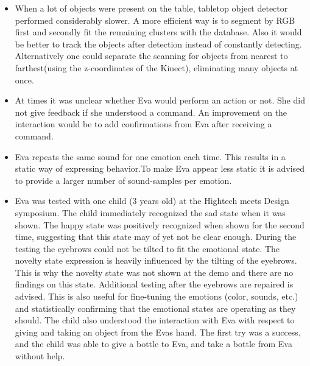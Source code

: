 \documentclass[project_eva.tex]{subfiles}
\begin{document}
\begin{itemize}
\item When a lot of objects were present on the table, tabletop object detector performed considerably slower. A more efficient way is to segment by RGB first and secondly fit the remaining clusters with the database. Also it would be better to track the objects after detection instead of constantly detecting. Alternatively one could separate the scanning for objects from nearest to farthest(using the z-coordinates of the Kinect), eliminating many objects at once.

\item At times it was unclear whether Eva would perform an action or not. She did not give feedback if she understood a command. An improvement on the interaction would be to add confirmations from Eva after receiving a command.

\item Eva repeats the same sound for one emotion each time. This results in a static way of expressing behavior.To make Eva appear less static it is advised to provide a larger number of sound-samples per emotion.

\item Eva was tested with one child (3 years old) at the Hightech meets Design symposium. The child immediately recognized the sad state when it was shown. The happy state was positively recognized when shown for the second time, suggesting that this state may of yet not be clear enough.  During the testing the eyebrows could not be tilted to fit the emotional state. The novelty state expression is heavily influenced by the tilting of the eyebrows. This is why the novelty state was not shown at the demo and there are no findings on this state. Additional testing after the eyebrows are repaired is advised. This is also useful for fine-tuning the emotions (color, sounds, etc.) and statistically confirming that the emotional states are operating as they should.
The child also understood the interaction with Eva with respect to giving and taking an object from the Eva\textquotesingle s hand. The first try was a success, and the child was able to give a bottle to Eva, and take a bottle from Eva without help.
\end{itemize}
\end{document}
